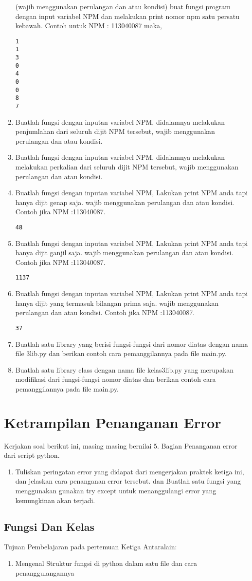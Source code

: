 \begin{enumerate}
\label{digitvar2}
(wajib menggunakan perulangan dan atau kondisi) buat fungsi program dengan input variabel NPM dan melakukan print nomor npm satu persatu kebawah.
Contoh untuk NPM : 113040087 maka,
\begin{verbatim}
1
1
3
0
4
0
0
8
7
\end{verbatim}
\item
Buatlah fungsi dengan inputan variabel NPM, didalamnya melakukan penjumlahan dari seluruh dijit NPM tersebut, wajib menggunakan perulangan dan atau kondisi.
\item 
Buatlah fungsi dengan inputan variabel NPM, didalamnya melakukan melakukan perkalian dari seluruh dijit NPM tersebut, wajib menggunakan perulangan dan atau kondisi.
\item
Buatlah fungsi dengan inputan variabel NPM, Lakukan print NPM anda tapi hanya dijit genap saja. wajib menggunakan perulangan dan atau kondisi. Contoh jika NPM :113040087.
\begin{verbatim}
48
\end{verbatim}
\item
Buatlah fungsi dengan inputan variabel NPM, Lakukan print NPM anda tapi hanya dijit ganjil saja. wajib menggunakan perulangan dan atau kondisi. Contoh jika NPM :113040087.
\begin{verbatim}
1137
\end{verbatim}
\item 
Buatlah fungsi dengan inputan variabel NPM, Lakukan print NPM anda tapi hanya dijit yang termasuk bilangan prima saja. wajib menggunakan perulangan dan atau kondisi. Contoh jika NPM :113040087.
\begin{verbatim}
37
\end{verbatim}
\item
Buatlah satu library yang berisi fungsi-fungsi dari nomor diatas dengan nama file 3lib.py dan berikan contoh cara pemanggilannya pada file main.py.
\item
Buatlah satu library class dengan nama file kelas3lib.py yang merupakan modifikasi dari fungsi-fungsi nomor diatas dan berikan contoh cara pemanggilannya  pada file main.py.
\end{enumerate}


\section{Ketrampilan Penanganan Error}
Kerjakan soal berikut ini, masing masing bernilai 5. Bagian Penanganan error dari script python.
\begin{enumerate}
\item
Tuliskan peringatan error yang didapat dari mengerjakan praktek ketiga ini, dan jelaskan cara penanganan error tersebut.
dan Buatlah satu fungsi yang menggunakan gunakan try except untuk menanggulangi error yang kemungkinan akan terjadi.
\end{enumerate}

\subsection{Fungsi Dan Kelas}
Tujuan Pembelajaran pada pertemuan Ketiga Antaralain:
\begin{enumerate}
    \item Mengenal Struktur fungsi di python dalam satu file dan cara penanggulangannya
    
\end{enumerate}